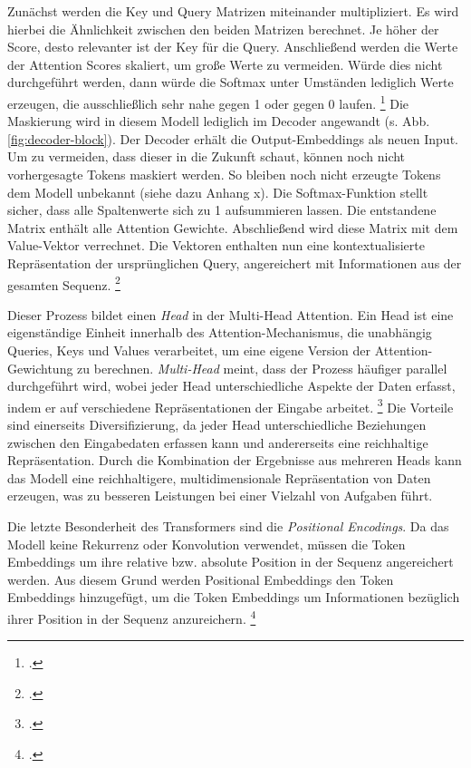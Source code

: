 Zunächst werden die Key und Query Matrizen miteinander multipliziert. Es wird hierbei die Ähnlichkeit zwischen den beiden Matrizen berechnet. Je höher der Score, desto relevanter ist der Key für die Query. Anschließend werden die Werte der Attention Scores skaliert, um große Werte zu vermeiden. Würde dies nicht durchgeführt werden, dann würde die Softmax %
unter Umständen lediglich Werte erzeugen, die ausschließlich sehr nahe gegen 1 oder gegen 0 laufen. \footcites[Vgl. dazu ausführlich][S. 4]{vaswani_attention_2017} Die Maskierung wird in diesem Modell lediglich im Decoder angewandt (s. Abb. \ref{fig:decoder-block}). Der Decoder erhält die Output-Embeddings als neuen Input. Um zu vermeiden, dass dieser in die Zukunft schaut, können noch nicht vorhergesagte Tokens maskiert werden. So bleiben noch nicht erzeugte Tokens dem Modell unbekannt (siehe dazu Anhang x). Die Softmax-Funktion stellt sicher, dass alle Spaltenwerte sich zu 1 aufsummieren lassen. Die entstandene Matrix enthält alle Attention Gewichte. Abschließend wird diese Matrix mit dem Value-Vektor verrechnet. Die Vektoren enthalten nun eine kontextualisierte Repräsentation der ursprünglichen Query, angereichert mit Informationen aus der gesamten Sequenz. \footcites[Vgl.][S. 62 f.]{tunstall_natural_2022}

Dieser Prozess bildet einen \emph{Head} in der Multi-Head Attention. Ein Head ist eine eigenständige Einheit innerhalb des Attention-Mechanismus, die unabhängig Queries, Keys und Values verarbeitet, um eine eigene Version der Attention-Gewichtung zu berechnen. \emph{Multi-Head} meint, dass der Prozess häufiger parallel durchgeführt wird, wobei jeder Head unterschiedliche Aspekte der Daten erfasst, indem er auf verschiedene Repräsentationen der Eingabe arbeitet. \footcites[Vgl.][S. 4 f.]{vaswani_attention_2017} Die Vorteile sind einerseits Diversifizierung, da jeder Head unterschiedliche Beziehungen zwischen den Eingabedaten erfassen kann und andererseits eine reichhaltige Repräsentation. Durch die Kombination der Ergebnisse aus mehreren Heads kann das Modell eine reichhaltigere, multidimensionale Repräsentation von Daten erzeugen, was zu besseren Leistungen bei einer Vielzahl von Aufgaben führt.

Die letzte Besonderheit des Transformers sind die \emph{Positional Encodings}. Da das Modell keine Rekurrenz oder Konvolution verwendet, müssen die Token Embeddings um ihre relative bzw. absolute Position in der Sequenz angereichert werden. Aus diesem Grund werden Positional Embeddings den Token Embeddings hinzugefügt, um die Token Embeddings um Informationen bezüglich ihrer Position in der Sequenz anzureichern. \footcites[Vgl.][S. 6]{vaswani_attention_2017}

